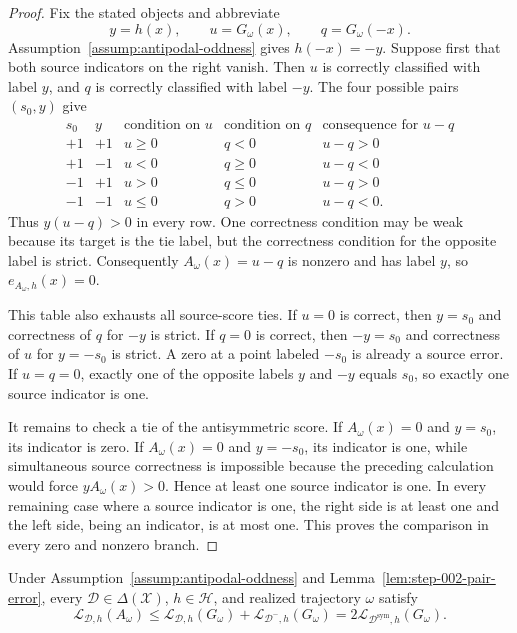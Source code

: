 \begin{proof}
Fix the stated objects and abbreviate
\[
 y=h(x),\qquad u=G_\omega(x),\qquad q=G_\omega(-x).
\]
Assumption~\ref{assump:antipodal-oddness} gives $h(-x)=-y$.  Suppose first
that both source indicators on the right vanish.  Then $u$ is correctly
classified with label $y$, and $q$ is correctly classified with label $-y$.
The four possible pairs $(s_0,y)$ give
\[
\begin{array}{c|c|c|c|c}
s_0&y&\text{condition on }u&\text{condition on }q&
  \text{consequence for }u-q\\ \hline
+1&+1&u\geq0&q<0&u-q>0\\
+1&-1&u<0&q\geq0&u-q<0\\
-1&+1&u>0&q\leq0&u-q>0\\
-1&-1&u\leq0&q>0&u-q<0.
\end{array}
\]
Thus $y(u-q)>0$ in every row.  One correctness condition may be weak
because its target is the tie label, but the correctness condition for the
opposite label is strict.  Consequently $A_\omega(x)=u-q$ is nonzero and
has label $y$, so $e_{A_\omega,h}(x)=0$.

This table also exhausts all source-score ties.  If $u=0$ is correct, then
$y=s_0$ and correctness of $q$ for $-y$ is strict.  If $q=0$ is correct,
then $-y=s_0$ and correctness of $u$ for $y=-s_0$ is strict.  A zero at a
point labeled $-s_0$ is already a source error.  If $u=q=0$, exactly one of
the opposite labels $y$ and $-y$ equals $s_0$, so exactly one source
indicator is one.

It remains to check a tie of the antisymmetric score.  If
$A_\omega(x)=0$ and $y=s_0$, its indicator is zero.  If
$A_\omega(x)=0$ and $y=-s_0$, its indicator is one, while simultaneous
source correctness is impossible because the preceding calculation would
force $yA_\omega(x)>0$.  Hence at least one source indicator is one.  In
every remaining case where a source indicator is one, the right side is at
least one and the left side, being an indicator, is at most one.  This proves
the comparison in every zero and nonzero branch.
\end{proof}

\begin{proposition}
\label{prop:step-002-risk-transfer}
Under Assumption~\ref{assump:antipodal-oddness} and
Lemma~\ref{lem:step-002-pair-error}, every
$\mathcal D\in\Delta(\mathcal X)$, $h\in\mathcal H$, and realized
trajectory $\omega$ satisfy
\[
 \mathcal L_{\mathcal D,h}(A_\omega)
 \leq \mathcal L_{\mathcal D,h}(G_\omega)
      +\mathcal L_{\mathcal D^-,h}(G_\omega)
 =2\mathcal L_{\mathcal D^{\mathrm{sym}},h}(G_\omega).
\]
\end{proposition}

